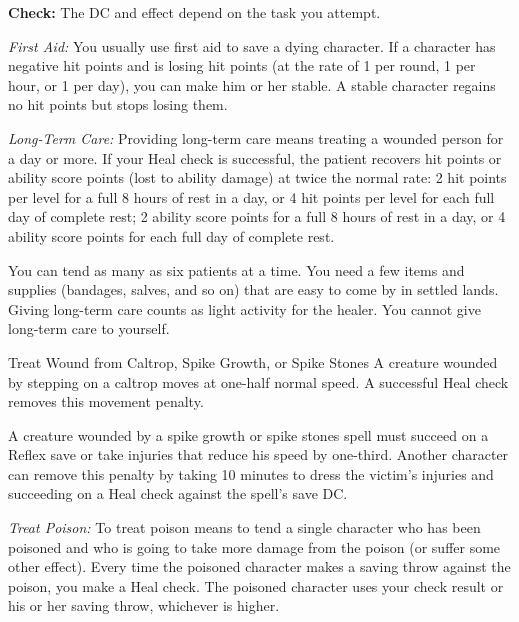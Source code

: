 \textbf{Check:} The DC and effect depend on the task you attempt.


\textit{First Aid:} You usually use first aid to save a dying character. If a character has negative hit points and is losing hit points (at the rate of 1 per round, 1 per hour, or 1 per day), you can make him or her stable. A stable character regains no hit points but stops losing them.

\textit{Long-Term Care:} Providing long-term care means treating a wounded person for a day or more. If your Heal check is successful, the patient recovers hit points or ability score points (lost to ability damage) at twice the normal rate: 2 hit points per level for a full 8 hours of rest in a day, or 4 hit points per level for each full day of complete rest; 2 ability score points for a full 8 hours of rest in a day, or 4 ability score points for each full day of complete rest.

You can tend as many as six patients at a time. You need a few items and supplies (bandages, salves, and so on) that are easy to come by in settled lands. Giving long-term care counts as light activity for the healer. You cannot give long-term care to yourself.

Treat Wound from Caltrop, Spike Growth, or Spike Stones
A creature wounded by stepping on a caltrop moves at one-half normal speed. A successful Heal check removes this movement penalty.

A creature wounded by a spike growth or spike stones spell must succeed on a Reflex save or take injuries that reduce his speed by one-third. Another character can remove this penalty by taking 10 minutes to dress the victim’s injuries and succeeding on a Heal check against the spell’s save DC.

\textit{Treat Poison:} To treat poison means to tend a single character who has been poisoned and who is going to take more damage from the poison (or suffer some other effect). Every time the poisoned character makes a saving throw against the poison, you make a Heal check. The poisoned character uses your check result or his or her saving throw, whichever is higher.

